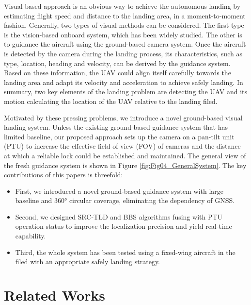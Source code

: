 Visual based approach is an obvious way to achieve the autonomous landing by estimating flight speed and distance to the landing area, in a moment-to-moment fashion. Generally, two types of visual methods can be considered. The first type is the vision-based onboard system, which has been widely studied. The other is to guidance the aircraft using the ground-based camera system. Once the aircraft is detected by the camera during the landing process, its characteristics, such as type, location, heading and velocity, can be derived by the guidance system. Based on these information, the UAV could align itself carefully towards the landing area and adapt its velocity and acceleration to achieve safely landing. In summary, two key elements of the landing problem are detecting the UAV and its motion calculating the location of the UAV relative to the landing filed. 

Motivated by these pressing problems, we introduce a novel ground-based visual landing system. Unless the existing ground-based guidance system that has limited baseline, our proposed approach sets up the camera on a pan-tilt unit (PTU) to increase the effective field of view (FOV) of cameras and the distance at which a reliable lock could be established and maintained. The general view of the fresh guidance system is shown in Figure \ref{fig:Fig04_GeneralSystem}. The key contributions of this papers is threefold:
\begin{itemize}
	\item First, we introduced a novel ground-based guidance system with large baseline and 360° circular coverage, eliminating the dependency of GNSS.
	\item Second, we designed SRC-TLD and BBS algorithms fusing with PTU operation status to improve the localization precision and yield real-time capability.
	\item Third, the whole system has been tested using a fixed-wing aircraft in the filed with an appropriate safely landing strategy.
\end{itemize}



\section{Related Works}

